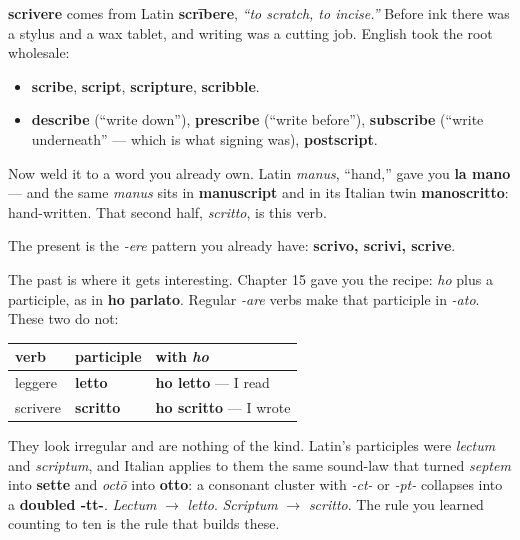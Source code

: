 \begin{cousinweb}
\textbf{scrivere} comes from Latin \textbf{scrībere}, \emph{\textquotedblleft{}to scratch, to incise.\textquotedblright{}} Before ink there was a stylus and a wax tablet, and writing was a cutting job. English took the root wholesale:

\begin{itemize}
\raggedright
  \item \textbf{scribe}, \textbf{script}, \textbf{scripture}, \textbf{scribble}.
  \item \textbf{describe} (\textquotedblleft{}write down\textquotedblright{}), \textbf{prescribe} (\textquotedblleft{}write before\textquotedblright{}), \textbf{subscribe} (\textquotedblleft{}write underneath\textquotedblright{} — which is what signing was), \textbf{postscript}.
\end{itemize}

Now weld it to a word you already own. Latin \emph{manus}, \textquotedblleft{}hand,\textquotedblright{} gave you \textbf{la mano} — and the same \emph{manus} sits in \textbf{manuscript} and in its Italian twin \textbf{manoscritto}: hand-written. That second half, \emph{scritto}, is this verb.
\end{cousinweb}

\begin{grammarlens}[title={Grammar Lens: the present, and two participles worth keeping}]
The present is the \emph{-ere} pattern you already have: \textbf{scrivo, scrivi, scrive}.

The past is where it gets interesting. Chapter 15 gave you the recipe: \emph{ho} plus a participle, as in \textbf{ho parlato}. Regular \emph{-are} verbs make that participle in \emph{-ato}. These two do not:

\noindent
\begin{tabularx}{\linewidth}{@{}>{\raggedright\arraybackslash}X>{\raggedright\arraybackslash}X>{\raggedright\arraybackslash}X@{}}
\toprule
\textbf{verb} & \textbf{participle} & \textbf{with \emph{ho}} \\
\midrule
leggere & \textbf{letto} & \textbf{ho letto} — I read \\
scrivere & \textbf{scritto} & \textbf{ho scritto} — I wrote \\
\bottomrule
\end{tabularx}

They look irregular and are nothing of the kind. Latin's participles were \emph{lectum} and \emph{scriptum}, and Italian applies to them the same sound-law that turned \emph{septem} into \textbf{sette} and \emph{octō} into \textbf{otto}: a consonant cluster with \emph{-ct-} or \emph{-pt-} collapses into a \textbf{doubled -tt-}. \emph{Lectum} $\to$ \emph{letto}. \emph{Scriptum} $\to$ \emph{scritto}. The rule you learned counting to ten is the rule that builds these.
\end{grammarlens}

